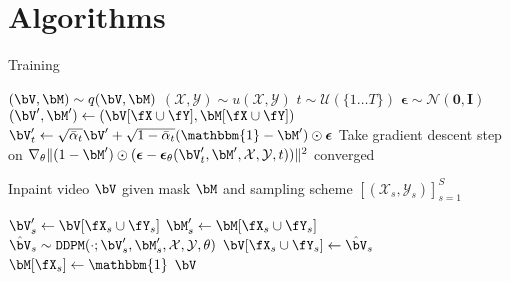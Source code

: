 \section{Algorithms}

\begin{algorithm}[h]
\caption{Training}
\label{alg:train}
\begin{algorithmic}[1]
\Repeat
\State $(\bV, \bM) \sim q(\bV, \bM)$
\State $(\mathcal{X}, \mathcal{Y}) \sim u(\mathcal{X}, \mathcal{Y})$
\State $t \sim \mathcal{U}(\{1 \ldots T\})$
\State $\boldsymbol{\epsilon} \sim \mathcal{N}(\mathbf{0}, \mathbf{I})$
\State $(\bV', \bM') \gets (\bV[\fX \cup \fY], \bM[\fX \cup \fY])$
\State $\bV_t' \gets \sqrt{\bar{\alpha}_t}\bV' + \sqrt{1-\bar{\alpha}_t}(\mathbbm{1}-\bM')\odot\boldsymbol{\epsilon}$
\State Take gradient descent step on \newline
\hspace*{3em}$\nabla_\theta \|(1-\bM')\odot(\boldsymbol{\epsilon} - \boldsymbol{\epsilon}_\theta(\bV_t', \bM', \mathcal{X}, \mathcal{Y}, t))\|^2$
\Until converged
\end{algorithmic}
\end{algorithm}

\begin{algorithm}[h]
\caption{Inpaint video $\bV$ given mask $\bM$ and sampling scheme $\left[(\mathcal{X}_s, \mathcal{Y}_s)\right]^S_{s=1}$}
\label{alg:alg}
\begin{algorithmic}[1]
\State $\bV_s' \gets \bV [\fX_s \cup \fY_s]$
\State $\bM_s' \gets \bM [\fX_s \cup \fY_s]$
\State $\hat{\bV}_s \sim \texttt{DDPM}(\cdot;\bV_s', \bM_s', \mathcal{X}, \mathcal{Y},\theta)$
\State $\bV [\fX_s \cup \fY_s] \gets \hat{\bV}_s$
\State $\bM [\fX_s] \gets \mathbbm{1}$
\EndFor
\State \Return $\bV$
\end{algorithmic}
\end{algorithm}